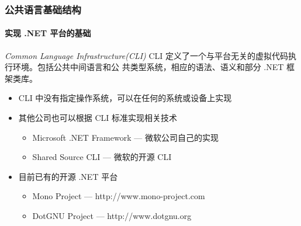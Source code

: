 



\begin{frame}
\frametitle{公共语言基础结构}
\framesubtitle{实现 .NET 平台的基础}
\begin{block}{\textit{Common Language Infrastructure(CLI)}}
  \CJKindent CLI 定义了一个与平台无关的虚拟代码执行环境。包括公共中间语言和公
  共类型系统，相应的语法、语义和部分 .NET 框架类库。
\end{block}
\begin{itemize}
\item<2-| handout:1> CLI 中没有指定操作系统，可以在任何的系统或设备上实现
\item<3-| handout:1> 其他公司也可以根据 CLI 标准实现相关技术
  \begin{itemize}
  \item Microsoft .NET Framework --- 微软公司自己的实现
  \item Shared Source CLI --- 微软的开源 CLI
  \end{itemize}
\item<4-| handout:1> 目前已有的开源 .NET 平台
  \begin{itemize}
  \item Mono Project --- http://www.mono-project.com
  \item DotGNU Project --- http://www.dotgnu.org
  \end{itemize}
\end{itemize}
\end{frame}


